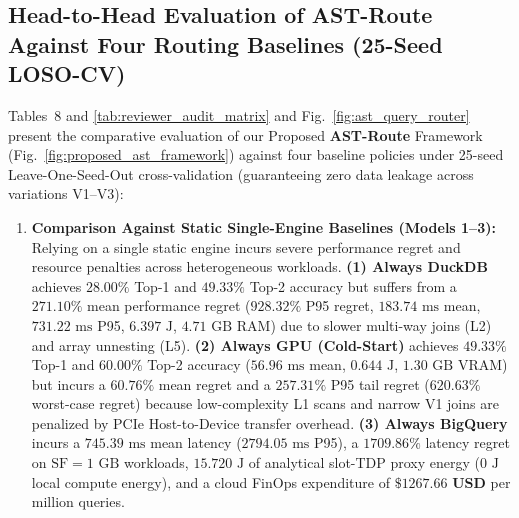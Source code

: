 \documentclass[10pt,a4paper]{article}
\begin{document}
\subsection{Head-to-Head Evaluation of AST-Route Against Four Routing Baselines (25-Seed LOSO-CV)}
Tables~8 and \ref{tab:reviewer_audit_matrix} and Fig.~\ref{fig:ast_query_router} present the comparative evaluation of our Proposed \textbf{AST-Route} Framework (Fig.~\ref{fig:proposed_ast_framework}) against four baseline policies under 25-seed Leave-One-Seed-Out cross-validation (guaranteeing zero data leakage across variations V1--V3):
\begin{enumerate}[leftmargin=1.5em,itemsep=2pt]
    \item \textbf{Comparison Against Static Single-Engine Baselines (Models 1--3):} Relying on a single static engine incurs severe performance regret and resource penalties across heterogeneous workloads. \textbf{(1) Always DuckDB} achieves $28.00\%$ Top-1 and $49.33\%$ Top-2 accuracy but suffers from a $\mathbf{271.10\%}$ mean performance regret ($928.32\%$ P95 regret, $183.74\text{ ms}$ mean, $731.22\text{ ms}$ P95, $6.397\text{ J}$, $4.71\text{ GB}$ RAM) due to slower multi-way joins (L2) and array unnesting (L5). \textbf{(2) Always GPU (Cold-Start)} achieves $49.33\%$ Top-1 and $60.00\%$ Top-2 accuracy ($56.96\text{ ms}$ mean, $0.644\text{ J}$, $1.30\text{ GB}$ VRAM) but incurs a $\mathbf{60.76\%}$ mean regret and a $\mathbf{257.31\%}$ P95 tail regret ($620.63\%$ worst-case regret) because low-complexity L1 scans and narrow V1 joins are penalized by PCIe Host-to-Device transfer overhead. \textbf{(3) Always BigQuery} incurs a $745.39\text{ ms}$ mean latency ($2794.05\text{ ms}$ P95), a $\mathbf{1709.86\%}$ latency regret on $\text{SF}=1\text{ GB}$ workloads, $15.720\text{ J}$ of analytical slot-TDP proxy energy ($0\text{ J}$ local compute energy), and a cloud FinOps expenditure of $\mathbf{\$1267.66\text{ USD}}$ per million queries.

\end{enumerate}
\end{document}
